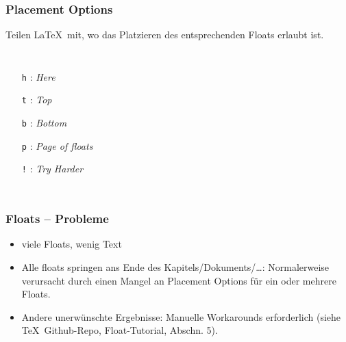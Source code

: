 \documentclass{beamer}                %
\newcommand*\code[1]{\texttt{#1}}
\begin{document}
\begin{frame}[fragile] %
    \frametitle{Placement Options}

    Teilen \LaTeX\ mit, wo das Platzieren des entsprechenden Floats erlaubt ist.

    \begin{columns}
        \begin{itemize}
            \item[\code{h}]: \emph{Here}
            \item[\code{t}]: \emph{Top}
            \item[\code{b}]: \emph{Bottom}
            \item[\code{p}]: \emph{Page of floats}
            \item[\code{!}]: \emph{Try Harder}
        \end{itemize}


    \end{columns}
\end{frame}
\begin{frame} %
    \frametitle{Floats -- Probleme}

    \begin{itemize}
        \item
            viele Floats, wenig Text
        \item
            Alle        floats       springen        ans       Ende        des
            Kapitels/Dokuments/\ldots: Normalerweise  verursacht  durch  einen
            Mangel an Placement Options f\"ur ein oder mehrere Floats.
        \item
            Andere     unerw\"unschte     Ergebnisse: Manuelle     Workarounds
            erforderlich (siehe \TeX\ Github-Repo, Float-Tutorial, Abschn. 5).
    \end{itemize}
\end{frame}
\end{document}

